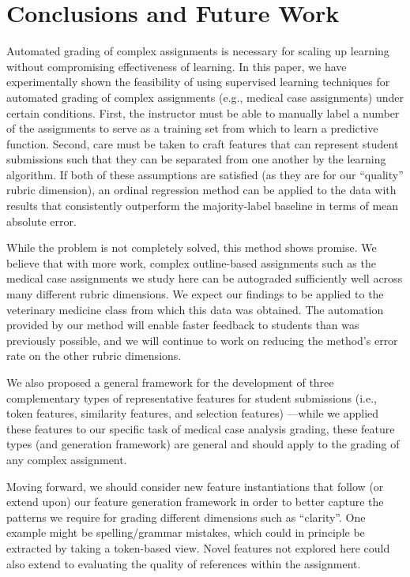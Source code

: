 \section{Conclusions and Future Work}

Automated grading of complex assignments is necessary for scaling up learning without compromising 
effectiveness of learning. In this paper, we have experimentally shown the feasibility of using
supervised learning techniques for automated grading of complex
assignments (e.g., medical case assignments) under certain conditions.
First, the instructor must be able to manually label a number of the
assignments to serve as a training set from which to learn a predictive
function. Second, care must be taken to craft features that can represent
student submissions such that they can be separated from one another by
the learning algorithm. If both of these assumptions are satisfied (as
they are for our ``quality'' rubric dimension), an ordinal regression
method can be applied to the data with results that consistently outperform
the majority-label baseline in terms of mean absolute error.

While the problem is not completely solved, this method shows promise. We
believe that with more work, complex outline-based assignments such as the
medical case assignments we study here can be autograded sufficiently well
across many different rubric dimensions. We expect our findings to be
applied to the veterinary medicine class from which this data was obtained.
The automation provided by our method will enable faster feedback to
students than was previously possible, and we will continue to work on
reducing the method's error rate on the other rubric dimensions.

We also proposed a general framework for the development of three complementary types of 
representative
features for student submissions (i.e., token features, similarity features, and selection features) ---while we applied these features to our
specific task of medical case analysis grading, these feature types (and
generation framework) are general and should apply to the grading of any
complex assignment.

Moving forward, we should consider new feature instantiations that follow
(or extend upon) our feature generation framework in order to better
capture the patterns we require for grading different dimensions such as
``clarity''. One example might be spelling/grammar mistakes, which could in
principle be extracted by taking a token-based view. Novel features not
explored here could also extend to evaluating the quality of references
within the assignment.

